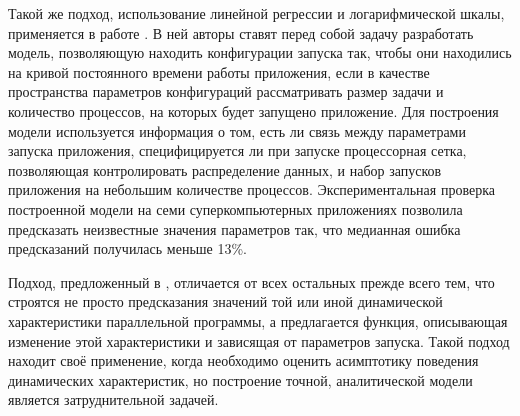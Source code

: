		Такой же подход, использование линейной регрессии и логарифмической шкалы, применяется в работе \cite{focused_regression}. В ней авторы ставят перед собой задачу разработать модель, позволяющую находить конфигурации запуска так, чтобы они находились на кривой постоянного времени работы приложения, если в качестве пространства параметров конфигураций рассматривать размер задачи и количество процессов, на которых будет запущено приложение. Для построения модели используется информация о том, есть ли связь между параметрами запуска приложения, специфицируется ли при запуске процессорная сетка, позволяющая контролировать распределение данных, и набор запусков приложения на небольшим количестве процессов. Экспериментальная проверка построенной модели на семи суперкомпьютерных приложениях позволила предсказать неизвестные значения параметров так, что медианная ошибка предсказаний получилась меньше 13\%.

		Подход, предложенный в \cite{analytic_func}, отличается от всех остальных прежде всего тем, что строятся не просто предсказания значений той или иной динамической характеристики параллельной программы, а предлагается функция, описывающая изменение этой характеристики и зависящая от параметров запуска. Такой подход находит своё применение, когда необходимо оценить асимптотику поведения динамических характеристик, но построение точной, аналитической модели является затруднительной задачей.
			
